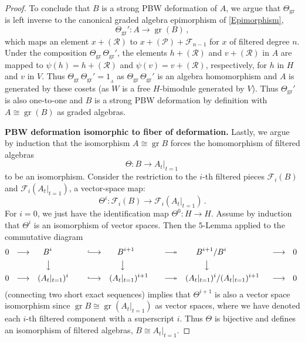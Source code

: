 \documentclass[11pt]{amsart}
\numberwithin{equation}{section}
\DeclareMathOperator{\gr}{gr}
\newcommand{\BBB}{B}
\newcommand{\sA}{A }
\newcommand{\RR}{\mathscr{R} }
\newcommand{\PP}{\mathscr{P}}
\newcommand{\LH}{{\rm{lh}}}
\renewcommand{\_}[1]{\mbox{$_{\left( #1 \right)}$}}
\newcommand{\F}{\mathcal F}
\newcommand{\Ho}{H}%
\begin{document}
{\begin{proof}
 To conclude that $\BBB$ is a strong PBW deformation of $\sA$,
 we argue
that $\Theta_{\gr}$ is left inverse to the  canonical graded
algebra epimorphism
of \cref{Epimorphism},
 $$
 \Theta_{\gr}':
 \sA %
 \longrightarrow
 \gr(\BBB)
 \, ,
 $$
which maps an element $x+(\RR)$
 to
 $x + (\PP) + \mathcal{F}_{n-1}$
 for $x$ of filtered degree $n$.
Under the composition $\Theta_{\gr}\, \Theta_{\gr}'$,
 the elements $h+(\RR)$ and $v+(\RR)$ in $\sA$
 are mapped to
$\psi(h) 
 =h+(\RR)$ and $\psi(v)
 =v+(\RR)$, respectively, for $h$ in $H$ and $v$ in $V$.
Thus $\Theta_{\gr}\, \Theta_{\gr}'=1_{_\sA}$ as
 $\Theta_{\gr}\, \Theta_{\gr}'$ is an algebra homomorphism
 and $\sA$ is generated by these cosets (as $W$ is a free $H$-bimodule
 generated by $V$).
 Thus $\Theta_{\gr}'$ is also one-to-one
 and $\BBB$ is a strong PBW deformation by definition with
 $\sA\cong \gr(\BBB)$  as graded algebras.

 
{\bf PBW deformation isomorphic to fiber of deformation.}
Lastly, we argue by induction that the isomorphism $\sA\cong \gr \BBB$
forces the homomorphism of filtered algebras
$$
\Theta: \BBB   \longrightarrow \sA_t|_{t=1} \, $$
to be an isomorphism.
Consider the restriction to the 
$i$-th filtered pieces $\F_i(\BBB)$ and $\F_i(\sA_t|_{t=1})$,
a vector-space map:
$$
\Theta^i: \F_i(\BBB)     \longrightarrow \F_i(\sA_t|_{t=1}) \,  . $$
For $i=0$,
we just have the identification map $\Theta^0: \Ho \rightarrow \Ho$. 
Assume by induction that $\Theta^i$ is an isomorphism
of vector spaces.  Then the $5$-Lemma
applied to the commutative diagram
$$
\begin{aligned}
  0\ \  \longrightarrow &&&\ \  \BBB^{i} &&&
  \lhook\joinrel\longrightarrow %
  &&&\ \  \ \BBB^{i+1} &&&
  \relbar\joinrel\twoheadrightarrow %
  &&& \ \  \ \ \BBB^{i+1}/\BBB^i &&
  \longrightarrow\ \  0
  \\ &&& \ \ \ \big\downarrow\ \  &&&  &&& \ \ \ \ \big\downarrow \ \
  &&& &&& \ \ \  \ \ \ \ \big\downarrow 
  \\
  0\ \ \longrightarrow &&& (\sA_t|_{t=1})^{i}\  &&&
  \lhook\joinrel\longrightarrow %
  &&& (\sA_t|_{t=1})^{i+1} &&&
  \relbar\joinrel\twoheadrightarrow %
  &&& (\sA_t|_{t=1})^{i}/ (\sA_t|_{t=1})^{i+1} \ &&
  \longrightarrow\ \  0\ 
\end{aligned}
$$
(connecting two short exact sequences)
implies that $\Theta^{i+1}$
is also a vector space isomorphism
since
$\gr \BBB \cong \gr(\sA_t\big|_{t=1})$
as vector spaces, where we have denoted each $i$-th filtered
component with a superscript $i$.
Thus $\Theta$ is bijective and defines an isomorphism 
of filtered algebras, $\BBB \cong \sA_t|_{t=1}$. 


\end{proof}}
\end{document}
